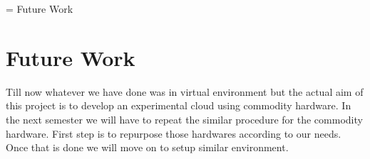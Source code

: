 \chapname = {Future Work}

\chapter{Future Work}

Till now whatever we have done was in virtual environment but the actual aim of this project is to develop an experimental cloud using commodity hardware. In the next semester we will have to repeat the similar procedure for the commodity hardware. First step is to repurpose those hardwares according to our needs. Once that is done we will move on to setup similar environment.